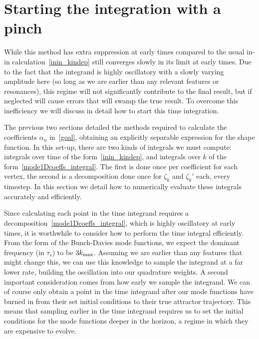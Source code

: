 \section{Starting the integration with a pinch}
While this method has extra suppression at early times compared to the
usual in-in calculation~\eqref{inin_kindep} still converges slowly
in its limit at early times. Due to the fact that the integrand is highly oscillatory
with a slowly varying amplitude here (so long as we are earlier than
any relevant features or resonances), this regime will not significantly
contribute to the final result, but if neglected will cause errors that will
swamp the true result. To overcome this inefficiency we will discuss in detail
how to start this time integration.



The previous two sections detailed the methods required to calculate
the coefficients $\alpha_n$ in~\eqref{goal}, obtaining an
explicitly separable expression for the shape function.
In this set-up,
there are two kinds of integrals we must compute: integrals over time of
the form~\eqref{inin_kindep}, and integrals over $k$ of the form~\eqref{mode1Dcoeffs_integral}.
The first is done once per coefficient for each vertex, the second is a decomposition
done once for $\zeta_k$ and $\zeta_k'$ each, every timestep.
In this section we detail how to numerically evaluate these
integrals accurately and efficiently.


Since calculating each point in the time integrand requires a
decomposition~\eqref{mode1Dcoeffs_integral}, which is highly oscillatory
at early times, it is worthwhile to consider how to perform the
time integral efficiently. From the form of the Bunch-Davies mode functions,
we expect the dominant frequency (in $\tau_s$) to be $3{k_\text{max}}$.
Assuming we are earlier than any features that might change this,
we can use this knowledge to sample the integrand at a far lower rate,
building the oscillation into our quadrature weights.
A second important consideration comes from how early we sample the integrand.
We can of course only obtain a point in the time integrand after our mode
functions have burned in from their set initial conditions to their true
attractor trajectory. This means that sampling earlier in the time integrand
requires us to set the initial conditions for the mode functions deeper
in the horizon, a regime in which they are expensive to evolve.


